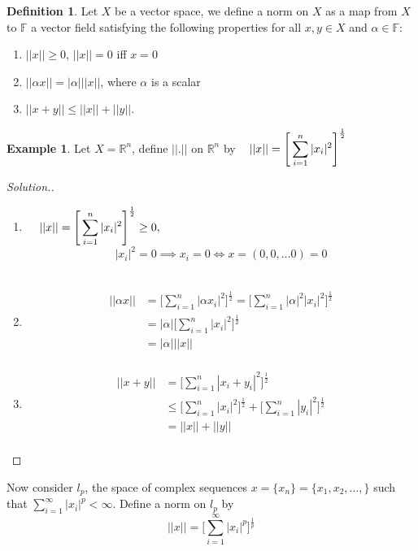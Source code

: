 \documentclass[11pt,a4paper]{article}
\theoremstyle{definition}
\newtheorem{defn}[thm]{Definition}
\newtheorem{exa}[thm]{Example}
\newenvironment{solution}
  {\renewcommand{\qedsymbol}{}\begin{proof}[\textit{Solution}.]}
  {\end{proof}}
\begin{document}
\begin{defn}
Let $X$ be a vector space, we define a norm on $X$ as a map from $X$ to $\mathbb{F}$ a vector field satisfying the following properties for all $x,y\in X$ and $\alpha \in \mathbb{F}$:
\begin{enumerate}
\item[i] $||x||\geq 0$, $||x||=0$ iff $x=0$
\item[ii] $||\alpha x||=|\alpha|||x||$, where $\alpha$ is a scalar
\item[iii] $||x+y||\leq ||x|| +||y||$.
\end{enumerate}
\end{defn}


\begin{exa}
Let $X=\mathbb{R}^n$, define $||.||$ on $\mathbb{R}^n$ by $\hspace{0.3cm}\displaystyle{||x||=\Bigg[\sum^{n}_{i=1}|x_i|^2\Bigg]^{\frac{1}{2}}}$

\end{exa}


\begin{solution}
\begin{enumerate}
\item[i] $\hspace{0.4cm}\displaystyle{||x||=\Bigg[\sum^{n}_{i=1}|x_i|^2\Bigg]^{\frac{1}{2}}\geq 0},$\\ $$|x_i|^2=0\implies x_i=0\iff x=(0,0,\dots0)=0$$\\

\item[ii]
\begin{align*}
||\alpha x|| &=\Bigg[\sum^n_{i=1}|\alpha x_i|^2\Bigg]^{\frac{1}{2}}
              =\Bigg[\sum^n_{i=1}|\alpha|^2|x_i|^2\Bigg]^{\frac{1}{2}}\\
             &=|\alpha|\Bigg[\sum^n_{i=1}|x_i|^2\Bigg]^{\frac{1}{2}}\\
             &=|\alpha|||x||\\
\end{align*}
\item[iii]
\begin{align*}
||x+y|| &=\Bigg[\sum^n_{i=1}|x_i+y_i|^2\Bigg]^{\frac{1}{2}}\\
        &\leq \Bigg[\sum^n_{i=1}|x_i|^2\Bigg]^{\frac{1}{2}}+\Bigg[\sum^n_{i=1}|y_i|^2\Bigg]^{\frac{1}{2}}\\
        &=||x||+||y||\\
\end{align*}
\end{enumerate}
\end{solution}
Now consider $l_p$, the space of complex sequences $x=\{x_n\}=\{x_1,x_2,\dots,\}$ such that $\sum\limits^{\infty}_{i=1}|x_i|^p<\infty$. Define a norm on $l_p$ by $$||x||=\Bigg[\sum^{\infty}_{i=1}|x_i|^p\Bigg]^{\frac{1}{p}}$$
\end{document}
